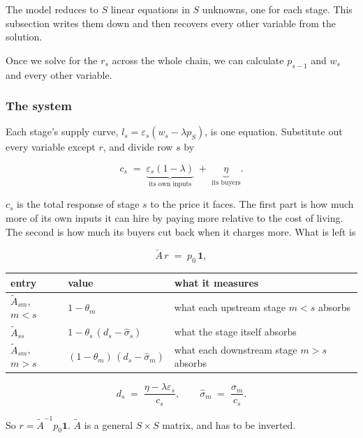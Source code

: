 \documentclass[11pt,a4paper]{article}
\begin{document}
The model reduces to $S$ linear equations in $S$ unknowns, one for each stage. This subsection writes them down and then recovers every other variable from the solution.

Once we solve for the $r_s$ across the whole chain, we can calculate $p_{s-1}$ and $w_s$ and every other variable.
\subsubsection*{The system}

Each stage's supply curve, $l_s = \varepsilon_s(w_s - \lambda p_S)$, is one equation. Substitute out every variable except $r$, and divide row $s$ by

\begin{equation}
c_s \;=\; \underbrace{\varepsilon_s(1-\lambda)}_{\text{its own inputs}} \;+\; \underbrace{\eta}_{\text{its buyers}} .
\end{equation}

$c_s$ is the total response of stage $s$ to the price it faces. The first part is how much more of its own inputs it can hire by paying more relative to the cost of living. The second is how much its buyers cut back when it charges more. What is left is

\begin{equation}
\tilde A\, r \;=\; p_0\, \mathbf{1} ,
\label{eq:system}
\end{equation}

\begin{center}
\small
\begin{tabular}{lll}
\toprule
\textbf{entry} & \textbf{value} & \textbf{what it measures} \\
\midrule
$\tilde A_{sm}$, $m < s$ & $1-\theta_m$ & what each upstream stage $m<s$ absorbs\\
$\tilde A_{ss}$ & $1 - \theta_s\,(d_s - \hat\sigma_s)$ & what the stage itself absorbs \\
$\tilde A_{sm}$, $m > s$ & $(1-\theta_m)\,(d_s - \hat\sigma_m)$ & what each downstream stage $m>s$ absorbs \\
\bottomrule
\end{tabular}
\end{center}

\begin{equation}
d_s \;=\; \frac{\eta - \lambda \varepsilon_s}{c_s} ,
\qquad
\hat\sigma_m \;=\; \frac{\sigma_m}{c_s} .
\end{equation}

So $r = \tilde A^{-1} p_0 \mathbf{1}$. $\tilde A$ is a general $S \times S$ matrix, and has to be inverted.
\end{document}
